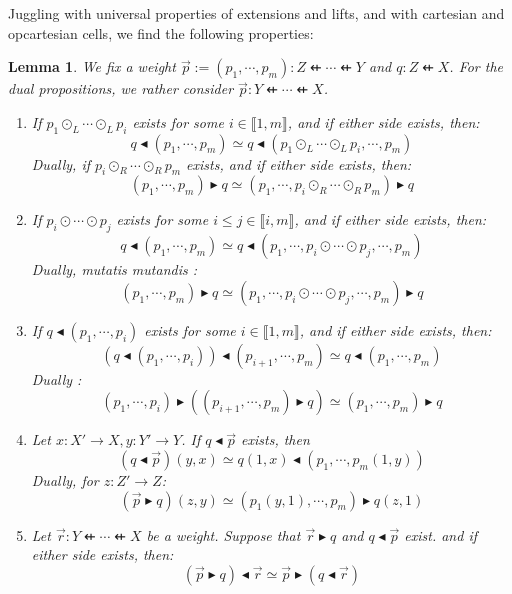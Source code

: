 \documentclass[10pt,a4paper]{article}
\newcommand{\dfrom}{\nvleftarrow}
\newcommand{\iset}[1]{\llbracket #1 \rrbracket}
\newcommand{\rext}{\mathbin{\blacktriangleright}}
\newcommand{\rift}{\mathbin{\blacktriangleleft}}
\theoremstyle{plain}
\newtheorem{lemma}[theorem]{Lemma}
\theoremstyle{definition}
\theoremstyle{remark}
\begin{document}
Juggling with universal properties of extensions and lifts, and with cartesian and opcartesian cells, we find the following properties:

\begin{lemma}
    \label{lem:ext_lift}
    We fix a weight $\vec{p} := (p_1, \cdots, p_m) : Z \dfrom \cdots \dfrom Y$ and $q : Z \dfrom X$. For the dual propositions, we rather consider $\vec{p} : Y \dfrom \cdots \dfrom X$.
    \begin{enumerate}[ref=\ref{lem:ext_lift} (\alph*)]
        \item \label{lem:ext_lift:stab_wcomp} If $p_1 \odot_L \cdots \odot_L p_i$ exists for some $i\in\iset{1, m}$, and if either side exists, then:
            $$q \rift (p_1, \cdots, p_m) \simeq q \rift (p_1 \odot_L \cdots \odot_L p_i ,\cdots, p_m)$$
            Dually, if $p_i \odot_R \cdots \odot_R p_m$ exists, and if either side exists, then:
            $$(p_1, \cdots, p_m) \rext q \simeq (p_1, \cdots, p_i \odot_R \cdots \odot_R p_m) \rext q$$
        \item \label{lem:ext_lift:stab_comp} If $p_i \odot \cdots \odot p_j$ exists for some $i \leq j \in \iset{i, m}$, and if either side exists, then:
            $$q \rift (p_1, \cdots, p_m) \simeq q \rift (p_1, \cdots, p_i \odot \cdots \odot p_j, \cdots, p_m)$$
            Dually, mutatis mutandis :
            $$(p_1, \cdots, p_m) \rext q \simeq (p_1, \cdots, p_i \odot \cdots \odot p_j, \cdots, p_m) \rext q$$
        \item \label{lem:ext_lift:stab_split} If $q \rift (p_1, \cdots, p_i)$ exists for some $i\in\iset{1, m}$, and if either side exists, then:
            $$(q \rift (p_1, \cdots, p_i)) \rift (p_{i+1}, \cdots, p_m) \simeq q \rift(p_1, \cdots, p_m)$$
            Dually :
            $$(p_1, \cdots, p_i) \rext ((p_{i+1}, \cdots, p_m) \rext q) \simeq (p_1, \cdots, p_m) \rext q$$
        \item \label{lem:ext_lift:res} Let $x : X' \to X, y : Y' \to Y$. If $q \rift \vec{p}$ exists, then
            $$(q \rift \vec{p})(y, x) \simeq q(1, x) \rift (p_1, \cdots, p_m(1, y))$$
            Dually, for $z : Z' \to Z$:
            $$(\vec{p} \rext q)(z, y) \simeq (p_1(y, 1), \cdots, p_m)\rext q(z, 1)$$
        \item \label{lem:ext_lift:assoc_rift_rext} Let $\vec{r} : Y \dfrom \cdots \dfrom X$ be a weight. Suppose that $\vec{r} \rext q$ and $q \rift \vec{p}$ exist. and if either side exists, then:
            $$(\vec{p} \rext q) \rift \vec{r} \simeq \vec{p} \rext (q \rift \vec{r})$$
    \end{enumerate}
\end{lemma}
\end{document}
